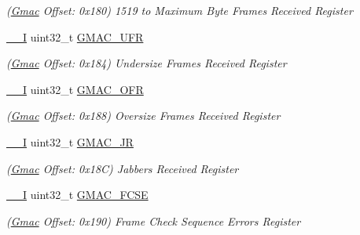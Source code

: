 \begin{DoxyCompactItemize}
\begin{DoxyCompactList}\small\item\em (\mbox{\hyperlink{structGmac}{Gmac}} Offset\+: 0x180) 1519 to Maximum Byte Frames Received Register \end{DoxyCompactList}\item 
\mbox{\label{structGmac_a55611ca450100192122d995a0e596ba0}} 
\mbox{\hyperlink{core__cm7_8h_af63697ed9952cc71e1225efe205f6cd3}{\+\_\+\+\_\+I}} uint32\+\_\+t \mbox{\hyperlink{structGmac_a55611ca450100192122d995a0e596ba0}{G\+M\+A\+C\+\_\+\+U\+FR}}
\begin{DoxyCompactList}\small\item\em (\mbox{\hyperlink{structGmac}{Gmac}} Offset\+: 0x184) Undersize Frames Received Register \end{DoxyCompactList}\item 
\mbox{\label{structGmac_aa4e254c599e6d90ccf139dcbc5cc2619}} 
\mbox{\hyperlink{core__cm7_8h_af63697ed9952cc71e1225efe205f6cd3}{\+\_\+\+\_\+I}} uint32\+\_\+t \mbox{\hyperlink{structGmac_aa4e254c599e6d90ccf139dcbc5cc2619}{G\+M\+A\+C\+\_\+\+O\+FR}}
\begin{DoxyCompactList}\small\item\em (\mbox{\hyperlink{structGmac}{Gmac}} Offset\+: 0x188) Oversize Frames Received Register \end{DoxyCompactList}\item 
\mbox{\label{structGmac_a33b4e0cd344c8e352c28e12523ae625e}} 
\mbox{\hyperlink{core__cm7_8h_af63697ed9952cc71e1225efe205f6cd3}{\+\_\+\+\_\+I}} uint32\+\_\+t \mbox{\hyperlink{structGmac_a33b4e0cd344c8e352c28e12523ae625e}{G\+M\+A\+C\+\_\+\+JR}}
\begin{DoxyCompactList}\small\item\em (\mbox{\hyperlink{structGmac}{Gmac}} Offset\+: 0x18C) Jabbers Received Register \end{DoxyCompactList}\item 
\mbox{\label{structGmac_a93f0f0461e800c3676bd41f907e1a300}} 
\mbox{\hyperlink{core__cm7_8h_af63697ed9952cc71e1225efe205f6cd3}{\+\_\+\+\_\+I}} uint32\+\_\+t \mbox{\hyperlink{structGmac_a93f0f0461e800c3676bd41f907e1a300}{G\+M\+A\+C\+\_\+\+F\+C\+SE}}
\begin{DoxyCompactList}\small\item\em (\mbox{\hyperlink{structGmac}{Gmac}} Offset\+: 0x190) Frame Check Sequence Errors Register \end{DoxyCompactList}\item 

\end{DoxyCompactItemize}
